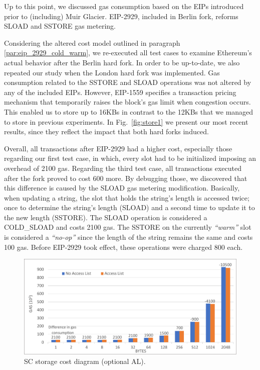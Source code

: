 Up to this point, we discussed gas consumption based on the EIPs introduced prior to (including) Muir Glacier. EIP-2929, included in Berlin fork, reforms SLOAD and SSTORE gas metering.

Considering the altered cost model outlined in paragraph \ref{par:eip_2929_cold_warm}, we re-executed all test cases to examine Ethereum’s actual behavior after the Berlin hard fork. In order to be up-to-date, we also repeated our study when the London hard fork was implemented. Gas consumption related to the SSTORE and SLOAD operations was not altered by any of the included EIPs. However, EIP-1559 specifies a transaction pricing mechanism that temporarily raises the block’s gas limit when congestion occurs. This enabled us to store up to 16KBs in contrast to the 12KBs that we managed to store in previous experiments. In Fig.~\ref{fig:store1} we present our most recent results, since they reflect the impact that both hard forks induced.

Overall, all transactions after EIP-2929 had a higher cost, especially those regarding our first test case, in which, every slot had to be initialized imposing an overhead of 2100 gas. Regarding the third test case, all transactions executed after the fork proved to cost 600 more. By debugging those, we discovered that this difference is caused by the SLOAD gas metering modification. Basically, when updating a string, the slot that holds the string’s length is accessed twice; once to determine the string’s length (SLOAD) and a second time to update it to the new length (SSTORE). The SLOAD operation is considered a COLD\_SLOAD and costs 2100 gas. The SSTORE on the currently \emph{``warm''} slot is considered a \emph{``no-op''} since the length of the string remains the same and costs 100 gas. Before EIP-2929 took effect, these operations were charged 800 each.

\begin{figure}[htbp]
\centerline{\includegraphics[width=\textwidth]{figs/access_list.pdf}}
\caption{SC storage cost diagram (optional AL).}
\label{fig:access_list}
\end{figure}

